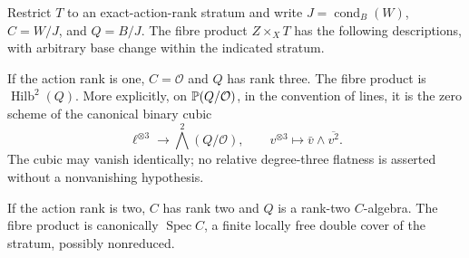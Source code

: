 \begin{proposition}
\label{prop:codim-two-incidence-fibres}
Restrict $T$ to an exact-action-rank stratum and write
$J=\operatorname{cond}_B(W)$, $C=W/J$, and $Q=B/J$.
The fibre product $Z\times_X T$ has the following descriptions,
with arbitrary base change within the indicated stratum.

If the action rank is one, $C=\mathcal O$ and $Q$ has rank three.
The fibre product is $\operatorname{Hilb}^2(Q)$. More explicitly,
on $\mathbb P(Q/\mathcal O)$, in the convention of lines, it is the zero
scheme of the canonical binary cubic
\begin{equation}\label{eq:cubic-extension}
 \ell^{\otimes3}\longrightarrow\bigwedge^2(Q/\mathcal O),
 \qquad v^{\otimes3}\longmapsto \bar v\wedge\overline{v^2}.
\end{equation}
The cubic may vanish identically; no relative degree-three flatness
is asserted without a nonvanishing hypothesis.

If the action rank is two, $C$ has rank two and $Q$ is a rank-two
$C$-algebra. The fibre product is canonically $\operatorname{Spec} C$,
a finite locally free double cover of the stratum, possibly nonreduced.
\end{proposition}
